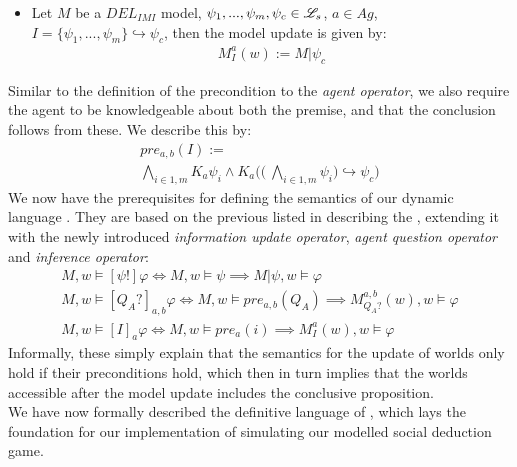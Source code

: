 \begin{itemize}
    \item Let $M$ be a $DEL_{IMI}$ model, $\psi_1,...,\psi_m, \psi_c \in \mathscr{L}_s$,
          $a\in Ag$, $I=\{\psi_1,...,\psi_m\} \hookrightarrow \psi_c$, then the model
          update is given by:
          \begin{gather}
              M^a_I(w) := M|\psi_c
          \end{gather}
\end{itemize}
Similar to the definition of the precondition to the \textit{agent operator}, we also require the agent to be knowledgeable about both the premise, and that the conclusion follows from these. We describe this by:
\begin{gather}
\nonumber pre_{a,b}(I) := \\ \bigwedge\limits_{i\in1,m}K_a\psi_i \land K_a\Biggl(\Biggl(\:\bigwedge\limits_{i\in 1,m}\psi_i\Biggr) \hookrightarrow \psi_c \Biggr)
\end{gather}
We now have the prerequisites for defining the semantics of our dynamic language \dynlang. They are based on the previous listed in  describing the \staticlang, extending it with the newly introduced \textit{information update operator}, \textit{agent question operator} and \textit{inference operator}:
\begin{gather}
    M, w \models [\psi!]\varphi \iff M, w \models \psi \implies M|\psi, w \models \varphi \\
    M, w \models [Q_A?]_{a,b}\varphi \iff M, w \models pre_{a,b}(Q_A) \implies M^{a,b}_{Q_A?}(w), w \models \varphi \\
    M, w \models [I]_a\varphi \iff M, w \models pre_a(i) \implies M^a_I(w), w \models \varphi
\end{gather}
Informally, these simply explain that the semantics for the update of worlds only hold if their preconditions hold, which then in turn implies that the worlds accessible after the model update includes the conclusive proposition. \\

We have now formally described the definitive language of \dynlang, which lays
the foundation for our implementation of simulating our modelled social
deduction game.